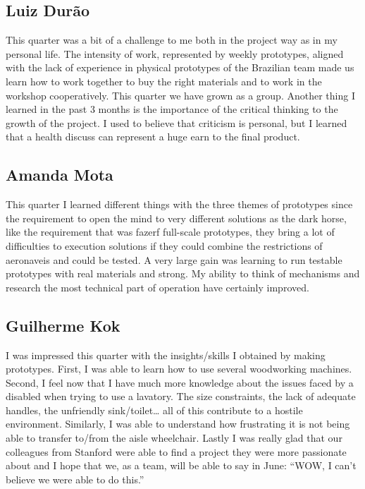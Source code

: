\subsection{Luiz Durão}
This quarter was a bit of a challenge to me both in the project way as in my personal life. The intensity of work, represented by weekly prototypes, aligned with the lack of experience in physical prototypes of the Brazilian team made us learn how to work together to buy the right materials and to work in the workshop cooperatively. This quarter we have grown as a group. Another  thing I learned in the past 3 months is the importance of the critical thinking to the growth of the project. I used to believe that criticism is personal, but I learned that a health discuss can represent a huge earn to the final product. 

\subsection{Amanda Mota}

This quarter I learned different things with the three themes of prototypes since the requirement to open the mind to very different solutions as the dark horse, like the requirement that was fazerf full-scale prototypes, they bring a lot of difficulties to execution solutions if they could combine the restrictions of aeronaveis and could be tested. 
A very large gain was learning to run testable prototypes with real materials and strong. My ability to think of mechanisms and research the most technical part of operation have certainly improved.

\subsection{Guilherme Kok}
I was impressed this quarter with the insights/skills I obtained by making prototypes. First, I was able to learn how to use several woodworking machines. Second, I 
feel now that I have much more knowledge about the issues faced by a disabled when trying to use a lavatory. The size constraints, the lack of adequate handles, the unfriendly sink/toilet… all of this contribute to a hostile environment. Similarly, I was able to understand how frustrating it is not being able to transfer to/from the aisle wheelchair. Lastly I was really glad that our colleagues from Stanford were able to find a project they were more passionate about and I hope that we, as a team, will be able to say in June: ``WOW, I can’t believe we were able to do this.'' 

